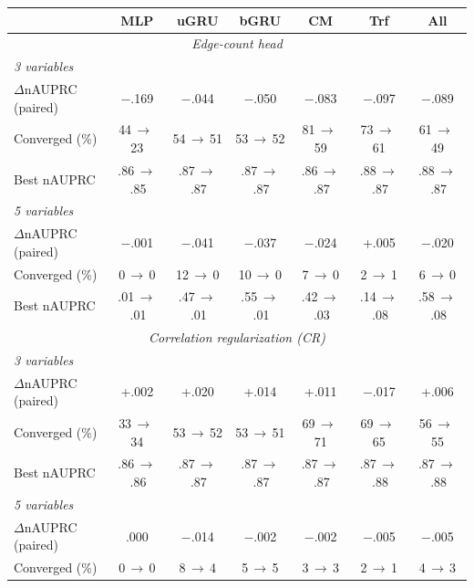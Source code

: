 \begin{table}[ht]
    \centering
    \small
    \setlength{\tabcolsep}{3pt}
    \begin{tabular}{lccccc|c}
    \toprule
        ~ & \textbf{MLP} & \textbf{uGRU} & \textbf{bGRU} & \textbf{CM} & \textbf{Trf} & \textbf{All} \\
    \midrule
        \multicolumn{7}{c}{\textit{Edge-count head}} \\
    \midrule
        \textit{3 variables} & \multicolumn{6}{c}{} \\
        \quad $\Delta$nAUPRC (paired) & $-$.169 & $-$.044 & $-$.050 & $-$.083 & $-$.097 & $-$.089 \\
        \quad Converged (\%) & 44\,$\to$\,23 & 54\,$\to$\,51 & 53\,$\to$\,52 & 81\,$\to$\,59 & 73\,$\to$\,61 & 61\,$\to$\,49 \\
        \quad Best nAUPRC & .86\,$\to$\,.85 & .87\,$\to$\,.87 & .87\,$\to$\,.87 & .86\,$\to$\,.87 & .88\,$\to$\,.87 & .88\,$\to$\,.87 \\
        \textit{5 variables} & \multicolumn{6}{c}{} \\
        \quad $\Delta$nAUPRC (paired) & $-$.001 & $-$.041 & $-$.037 & $-$.024 & +.005 & $-$.020 \\
        \quad Converged (\%) & 0\,$\to$\,0 & 12\,$\to$\,0 & 10\,$\to$\,0 & 7\,$\to$\,0 & 2\,$\to$\,1 & 6\,$\to$\,0 \\
        \quad Best nAUPRC & .01\,$\to$\,.01 & .47\,$\to$\,.01 & .55\,$\to$\,.01 & .42\,$\to$\,.03 & .14\,$\to$\,.08 & .58\,$\to$\,.08 \\
    \midrule
        \multicolumn{7}{c}{\textit{Correlation regularization (CR)}} \\
    \midrule
        \textit{3 variables} & \multicolumn{6}{c}{} \\
        \quad $\Delta$nAUPRC (paired) & +.002 & +.020 & +.014 & +.011 & $-$.017 & +.006 \\
        \quad Converged (\%) & 33\,$\to$\,34 & 53\,$\to$\,52 & 53\,$\to$\,51 & 69\,$\to$\,71 & 69\,$\to$\,65 & 56\,$\to$\,55 \\
        \quad Best nAUPRC & .86\,$\to$\,.86 & .87\,$\to$\,.87 & .87\,$\to$\,.87 & .87\,$\to$\,.87 & .87\,$\to$\,.88 & .87\,$\to$\,.88 \\
        \textit{5 variables} & \multicolumn{6}{c}{} \\
        \quad $\Delta$nAUPRC (paired) & .000 & $-$.014 & $-$.002 & $-$.002 & $-$.005 & $-$.005 \\
        \quad Converged (\%) & 0\,$\to$\,0 & 8\,$\to$\,4 & 5\,$\to$\,5 & 3\,$\to$\,3 & 2\,$\to$\,1 & 4\,$\to$\,3 \\

\end{tabular}
\end{table}
